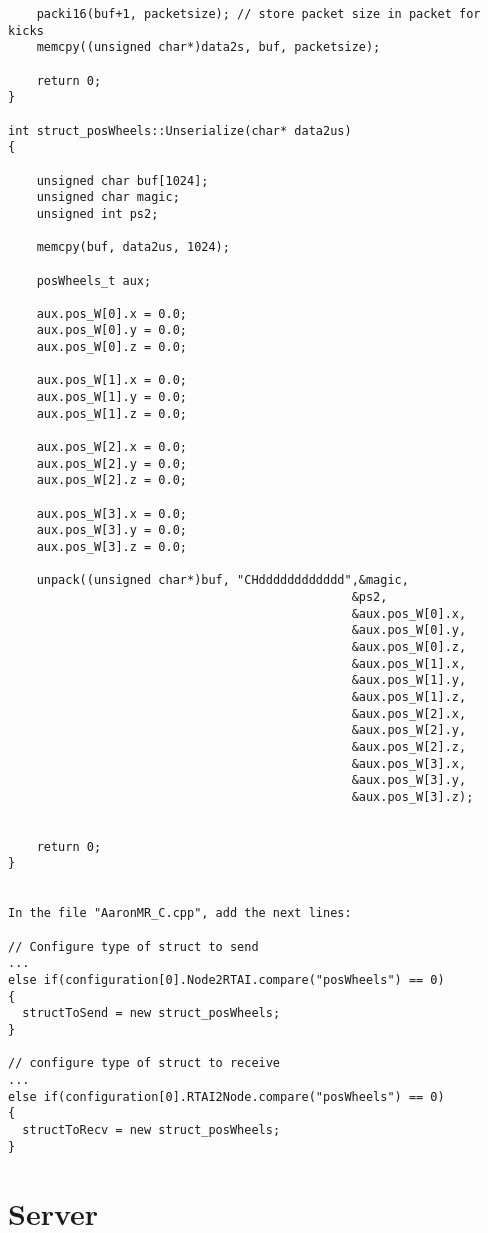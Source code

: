 \begin{verbatim}
    packi16(buf+1, packetsize); // store packet size in packet for kicks
    memcpy((unsigned char*)data2s, buf, packetsize);

    return 0;
}

int struct_posWheels::Unserialize(char* data2us)
{

    unsigned char buf[1024];
    unsigned char magic;
    unsigned int ps2;

    memcpy(buf, data2us, 1024);

    posWheels_t aux;

    aux.pos_W[0].x = 0.0;
    aux.pos_W[0].y = 0.0;
    aux.pos_W[0].z = 0.0;

    aux.pos_W[1].x = 0.0;
    aux.pos_W[1].y = 0.0;
    aux.pos_W[1].z = 0.0;

    aux.pos_W[2].x = 0.0;
    aux.pos_W[2].y = 0.0;
    aux.pos_W[2].z = 0.0;

    aux.pos_W[3].x = 0.0;
    aux.pos_W[3].y = 0.0;
    aux.pos_W[3].z = 0.0;

    unpack((unsigned char*)buf, "CHdddddddddddd",&magic,
                                                &ps2,
                                                &aux.pos_W[0].x,
                                                &aux.pos_W[0].y,
                                                &aux.pos_W[0].z,
                                                &aux.pos_W[1].x,
                                                &aux.pos_W[1].y,
                                                &aux.pos_W[1].z,
                                                &aux.pos_W[2].x,
                                                &aux.pos_W[2].y,
                                                &aux.pos_W[2].z,
                                                &aux.pos_W[3].x,
                                                &aux.pos_W[3].y,
                                                &aux.pos_W[3].z);


    return 0;
}


In the file "AaronMR_C.cpp", add the next lines:

// Configure type of struct to send
...
else if(configuration[0].Node2RTAI.compare("posWheels") == 0)
{
  structToSend = new struct_posWheels;
}

// configure type of struct to receive
...
else if(configuration[0].RTAI2Node.compare("posWheels") == 0)
{
  structToRecv = new struct_posWheels;
}

\end{verbatim}

\section{Server}

